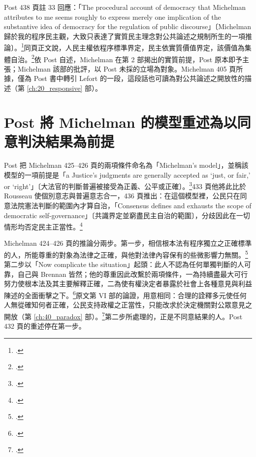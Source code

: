 Post 438 頁註 33 回應：「The procedural account of democracy that Michelman attributes to me seems roughly to express merely one implication of the substantive idea of democracy for the regulation of public discourse」〔Michelman 歸於我的程序民主觀，大致只表達了實質民主理念對公共論述之規制所生的一項推論〕。\footcite[438 n.33]{post1998}同頁正文說，人民主權依程序標準界定，民主依實質價值界定，該價值為集體自治。\footcite[438]{post1998}依 Post 自述，Michelman 在第 2 部揭出的實質前提，Post 原本即予主張；Michelman 該部的批評，以 Post 未採的立場為對象。Michelman 405 頁所據，僅為 Post 書中轉引 Lefort 的一段，這段話也可讀為對公共論述之開放性的描述（第 \ref{ch:20_responsive} 部）。

\section{Post 將 Michelman 的模型重述為以同意判決結果為前提}
\label{sec:70_misreadings-2}

Post 把 Michelman 425--426 頁的兩項條件命名為「Michelman's model」，並稱該模型的一項前提是「a Justice's judgments are generally accepted as `just, or fair,' or `right'」〔大法官的判斷普遍被接受為正義、公平或正確〕。\footcite[432]{post1998}433 頁他將此比於 Rousseau 使個別意志與普遍意志合一，436 頁推出：在這個模型裡，公民只在同意法院憲法判斷的範圍內才算自治，「Consensus defines and exhausts the scope of democratic self-governance」〔共識界定並窮盡民主自治的範圍〕，分歧因此在一切情形均否定民主正當性。\footcite[433, 436]{post1998}

Michelman 424--426 頁的推論分兩步。第一步，相信根本法有程序獨立之正確標準的人，所能尊重的對象為法律之正確，與他對法律內容保有的些微影響力無關。\footcite[425]{michelman1998}第二步以「Now complicate the situation」起頭：此人不認為任何單獨判斷的人可靠，自己與 Brennan 皆然；他的尊重因此改繫於兩項條件，一為持續盡最大可行努力使根本法及其主要解釋正確，二為使有權決定者暴露於社會上各種意見與利益陳述的全面衝擊之下。\footcite[425]{michelman1998}原文第 VI 部的論證，用意相同：合理的詮釋多元使任何人無從確知何者正確，公民支持政權之正當性，只能改求於決定機關對公眾意見之開放（第 \ref{ch:40_paradox} 部）。\footcite[422--423]{michelman1998}第二步所處理的，正是不同意結果的人。Post 432 頁的重述停在第一步。

